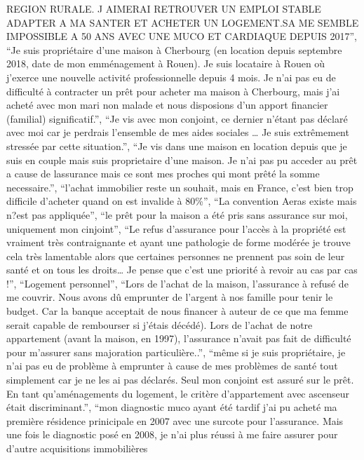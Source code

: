 \documentclass[
  letterpaper,
  DIV=11,
  numbers=noendperiod]{scrartcl}
\begin{document}
\begin{itemize}
  REGION RURALE. J AIMERAI RETROUVER UN EMPLOI STABLE ADAPTER A MA
  SANTER ET ACHETER UN LOGEMENT.SA ME SEMBLE IMPOSSIBLE A 50 ANS AVEC
  UNE MUCO ET CARDIAQUE DEPUIS 2017'', ``Je suis propriétaire d'une
  maison à Cherbourg (en location depuis septembre 2018, date de mon
  emménagement à Rouen). Je suis locataire à Rouen où j'exerce une
  nouvelle activité professionnelle depuis 4 mois. Je n'ai pas eu de
  difficulté à contracter un prêt pour acheter ma maison à Cherbourg,
  mais j'ai acheté avec mon mari non malade et nous disposions d'un
  apport financier (familial) significatif.'', ``Je vis avec mon
  conjoint, ce dernier n'étant pas déclaré avec moi car je perdrais
  l'ensemble de mes aides sociales \ldots{} Je suis extrêmement stressée
  par cette situation.'', ``Je vis dans une maison en location depuis
  que je suis en couple mais suis proprietaire d'une maison. Je n'ai pas
  pu acceder au prêt a cause de lassurance mais ce sont mes proches qui
  mont prêté la somme necessaire.'', ``l'achat immobilier reste un
  souhait, mais en France, c'est bien trop difficile d'acheter quand on
  est invalide à 80\%'', ``La convention Aeras existe mais n?est pas
  appliquée'', ``le prêt pour la maison a été pris sans assurance sur
  moi, uniquement mon cinjoint'', ``Le refus d'assurance pour l'accès à
  la propriété est vraiment très contraignante et ayant une pathologie
  de forme modérée je trouve cela très lamentable alors que certaines
  personnes ne prennent pas soin de leur santé et on tous les
  droits\ldots{} Je pense que c'est une priorité à revoir au cas par cas
  !'', ``Logement personnel'', ``Lors de l'achat de la maison,
  l'assurance à refusé de me couvrir. Nous avons dû emprunter de
  l'argent à nos famille pour tenir le budget. Car la banque acceptait
  de nous financer à auteur de ce que ma femme serait capable de
  rembourser si j'étais décédé). Lors de l'achat de notre appartement
  (avant la maison, en 1997), l'assurance n'avait pas fait de difficulté
  pour m'assurer sans majoration particulière..'', ``même si je suis
  propriétaire, je n'ai pas eu de problème à emprunter à cause de mes
  problèmes de santé tout simplement car je ne les ai pas déclarés. Seul
  mon conjoint est assuré sur le prêt. En tant qu'aménagements du
  logement, le critère d'appartement avec ascenseur était
  discriminant.'', ``mon diagnostic muco ayant été tardif j'ai pu acheté
  ma première résidence prinicipale en 2007 avec une surcote pour
  l'assurance. Mais une fois le diagnostic posé en 2008, je n'ai plus
  réussi à me faire assurer pour d'autre acquisitions immobilières

\end{itemize}
\end{document}

